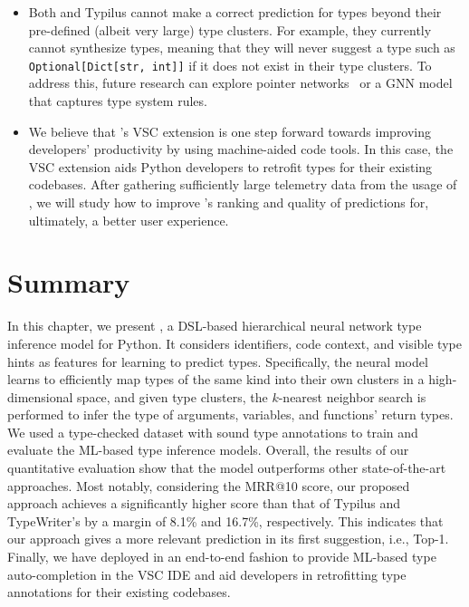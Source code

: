 \begin{itemize}
	
	\item Both \name and Typilus cannot make a correct prediction for types beyond their
	pre-defined (albeit very large) type clusters. For example, they currently cannot
	synthesize types, meaning that they will never suggest a type such as
	\texttt{Optional[Dict[str, int]]} if it does not exist in their type clusters.
	To address this, future research can explore pointer networks~\cite{vinyals2015pointer} or a GNN model that captures type system rules.
	
	\item We believe that \name's VSC extension is one step forward towards improving developers' productivity by using machine-aided code tools. 
	In this case, the VSC extension aids Python developers to retrofit types for their existing codebases. After gathering sufficiently large telemetry data from the usage of \name, we will study how to improve \name's ranking and quality of predictions for, ultimately, a better user experience.
\end{itemize}

\section{Summary}\label{ch4:sec:sum}
In this chapter, we present \name, a DSL-based hierarchical neural network type inference model for Python. It considers identifiers, code context, and visible type hints as features for learning to predict types. Specifically, the neural model learns to efficiently map types of the same kind into their own clusters in a high-dimensional space, and given type clusters, the $k$-nearest neighbor search is performed to infer the type of arguments, variables, and functions' return types. We used a type-checked dataset with sound type annotations to train and evaluate the ML-based type inference models. Overall, the results of our quantitative evaluation show that the \name model outperforms other state-of-the-art approaches. Most notably, considering the MRR@10 score, our proposed approach achieves a significantly higher score than that of Typilus and TypeWriter's by a margin of 8.1\% and 16.7\%, respectively. This indicates that our approach gives a more relevant prediction in its first suggestion, i.e., Top-1. Finally, we have deployed \name in an end-to-end fashion to provide ML-based type auto-completion in the VSC IDE and aid developers in retrofitting type annotations for their existing codebases.